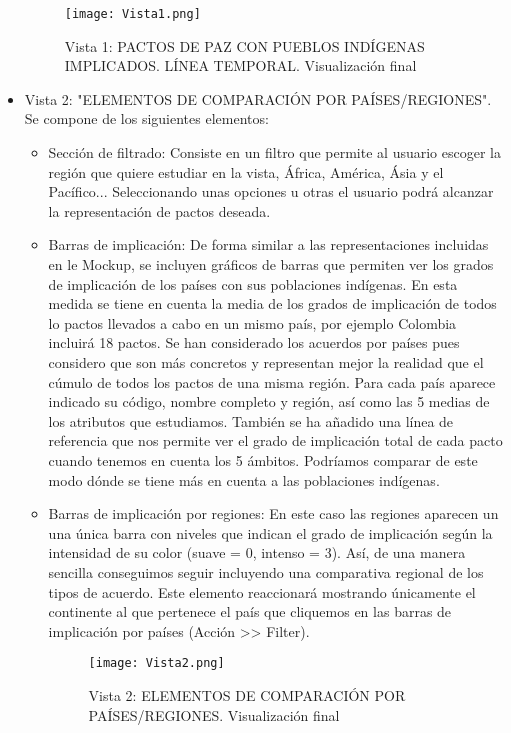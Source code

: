 \documentclass[11pt]{article}
\begin{document}
\begin{itemize}
\begin{figure}[h!]
    \caption{Vista 1: PACTOS DE PAZ CON PUEBLOS INDÍGENAS IMPLICADOS. LÍNEA TEMPORAL. Visualización final}
\texttt{[image: Vista1.png]}
\end{figure}

    \item Vista 2: "ELEMENTOS DE COMPARACIÓN POR PAÍSES/REGIONES". Se compone de los siguientes elementos:
    \begin{itemize}
        \item Sección de filtrado: Consiste en un filtro que permite al usuario escoger la región que quiere estudiar en la vista, África, América, Ásia y el Pacífico... Seleccionando unas opciones u otras el usuario podrá alcanzar la representación de pactos deseada.
        
        \item Barras de implicación: De forma similar a las representaciones incluidas en le Mockup, se incluyen gráficos de barras que permiten ver los grados de implicación de los países con sus poblaciones indígenas. En esta medida se tiene en cuenta la media de los grados de implicación de todos lo pactos llevados a cabo en un mismo país, por ejemplo Colombia incluirá 18 pactos. Se han considerado los acuerdos por países pues considero que son más concretos y representan mejor la realidad que el cúmulo de todos los pactos de una misma región. Para cada país aparece indicado su código, nombre completo y región, así como las 5 medias de los atributos que estudiamos. También se ha añadido una línea de referencia que nos permite ver el grado de implicación total de cada pacto cuando tenemos en cuenta los 5 ámbitos. Podríamos comparar de este modo dónde se tiene más en cuenta a las poblaciones indígenas.
        
        \item Barras de implicación por regiones: En este caso las regiones aparecen un una única barra con niveles que indican el grado de implicación según la intensidad de su color (suave = 0, intenso = 3). Así, de una manera sencilla conseguimos seguir incluyendo una comparativa regional de los tipos de acuerdo. Este elemento reaccionará mostrando únicamente el continente al que pertenece el país que cliquemos en las barras de implicación por países (Acción >> Filter).
        
        \begin{figure}[h]
\texttt{[image: Vista2.png]}
\caption{Vista 2: ELEMENTOS DE COMPARACIÓN POR PAÍSES/REGIONES. Visualización final}
\end{figure}
        
    \end{itemize}
\end{itemize}
\end{document}
